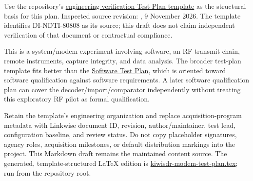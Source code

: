 \documentclass[11pt,a4paper]{article}
\begin{document}
Use the repository's \href{https://github.com/8r4n/acq-latex-templates/blob/fef160e37542fd7bc8e62de81404a83b8634a396/templates/engineering/verification/test-plan/main.tex}{engineering verification Test Plan template} as the structural basis for this plan. Inspected source revision: , 9 November 2026. The template identifies DI-NDTI-80808 as its source; this draft does not claim independent verification of that document or contractual compliance.

This is a system/modem experiment involving software, an RF transmit chain, remote instruments, capture integrity, and data analysis. The broader test-plan template fits better than the \href{https://github.com/8r4n/acq-latex-templates/blob/fef160e37542fd7bc8e62de81404a83b8634a396/templates/engineering/software/stp/main.tex}{Software Test Plan}, which is oriented toward software qualification against software requirements. A later software qualification plan can cover the decoder/import/comparator independently without treating this exploratory RF pilot as formal qualification.

Retain the template's engineering organization and replace acquisition-program metadata with Linkwise document ID, revision, author/maintainer, test lead, configuration baseline, and review status. Do not copy placeholder signatures, agency roles, acquisition milestones, or default distribution markings into the project. This Markdown draft remains the maintained content source. The generated, template-structured LaTeX edition is \href{../../../rust/docs/../../docs/testing/kiwisdr-modem-test-plan.tex}{kiwisdr-modem-test-plan.tex}; run  from the repository root.
\end{document}
